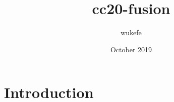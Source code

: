 \documentclass{article}
\title{cc20-fusion}
\author{wukefe }
\date{October 2019}
\begin{document}
\maketitle

\section{Introduction}
\end{document}
